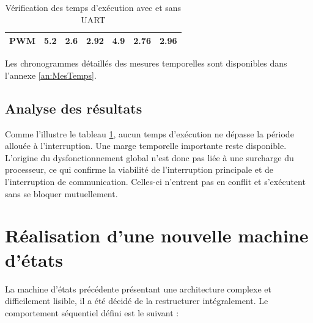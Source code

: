 \begin{table}[H]
{\begin{tabular}{|l|c|c|c|c|c|c|}
            PWM                                                    & 5.2                                                                 & 2.6                                                                    & 2.92                                                                   & 4.9                                                                 & 2.76                                                                   & 2.96                                                                   \\ \hline
        \end{tabular}%
    }
    \caption{Vérification des temps d'exécution avec et sans UART}
    \label{tab:verif_temps_final}
\end{table}

Les chronogrammes détaillés des mesures temporelles sont disponibles dans l'annexe \ref{an:MesTemps}.

\subsection{Analyse des résultats}
Comme l'illustre le tableau \ref{tab:verif_temps_final}, aucun temps d'exécution ne dépasse la période allouée à l'interruption. Une marge temporelle importante reste disponible. L'origine du dysfonctionnement global n'est donc pas liée à une surcharge du processeur, ce qui confirme la viabilité de l'interruption principale et de l'interruption de communication. Celles-ci n'entrent pas en conflit et s'exécutent sans se bloquer mutuellement.

\section{Réalisation d'une nouvelle machine d'états}
La machine d'états précédente présentant une architecture complexe et difficilement lisible, il a été décidé de la restructurer intégralement. Le comportement séquentiel défini est le suivant :

